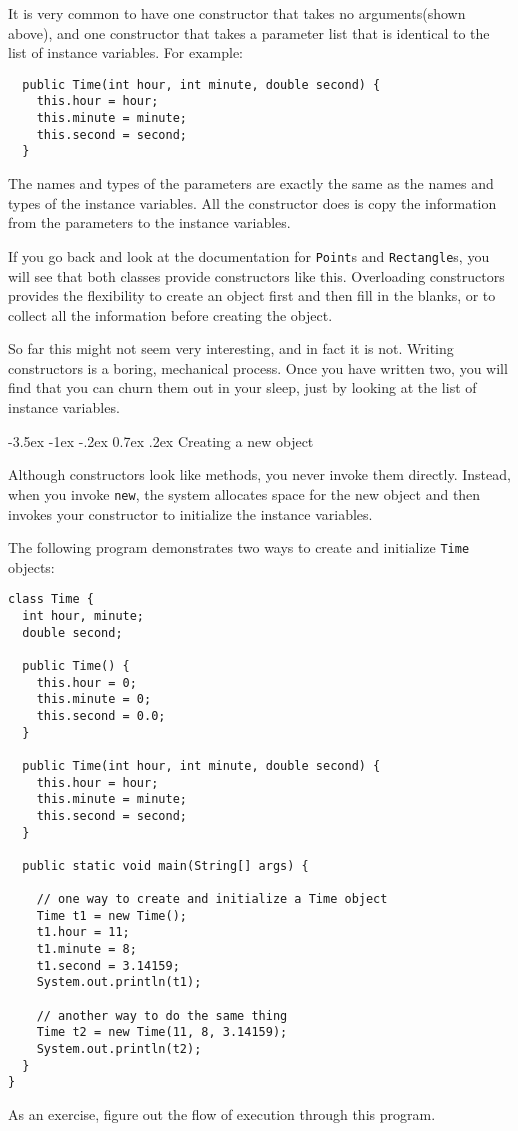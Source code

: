 \documentclass{book}
\makeatletter
\renewcommand{\section}{\@startsection 
    {section} {1} {0mm}%
    {-3.5ex \@plus -1ex \@minus -.2ex}%
    {0.7ex \@plus.2ex}%
    {\normalfont\Large\bfseries}}
\makeatother
\begin{document}
It is very common to have one constructor that takes no
arguments(shown above), and one constructor that takes
a parameter list that is identical to the list of instance
variables.  For example:

\begin{verbatim}
  public Time(int hour, int minute, double second) {
    this.hour = hour;
    this.minute = minute;
    this.second = second;
  }
\end{verbatim}
%
The names and types of the parameters are exactly the same as
the names and types of the instance variables.  All the
constructor does is copy the information from the parameters
to the instance variables.

If you go back and look at the documentation for {\tt Point}s
and {\tt Rectangle}s, you will see that both classes provide
constructors like this.  Overloading constructors provides the
flexibility to create an object first and then fill in the
blanks, or to collect all the information before creating
the object.

So far this might not seem very interesting, and in fact it
is not.  Writing constructors is a boring, mechanical process.
Once you have written two, you will find that you can churn them
out in your sleep, just by looking at the list of instance
variables.

\section{Creating a new object}

Although constructors look like methods, you never invoke them
directly.  Instead, when you invoke {\tt new}, the system
allocates space for the new object and then 
invokes your constructor to initialize the instance variables.

The following program demonstrates two ways to create and
initialize {\tt Time} objects:

\begin{verbatim}
class Time {
  int hour, minute;
  double second;

  public Time() {
    this.hour = 0;
    this.minute = 0;
    this.second = 0.0;
  }

  public Time(int hour, int minute, double second) {
    this.hour = hour;
    this.minute = minute;
    this.second = second;
  }

  public static void main(String[] args) {

    // one way to create and initialize a Time object
    Time t1 = new Time();
    t1.hour = 11;
    t1.minute = 8;
    t1.second = 3.14159;
    System.out.println(t1);

    // another way to do the same thing
    Time t2 = new Time(11, 8, 3.14159);
    System.out.println(t2);
  }
}
\end{verbatim}
%
As an exercise, figure out the flow of execution through this
program.
\end{document}
